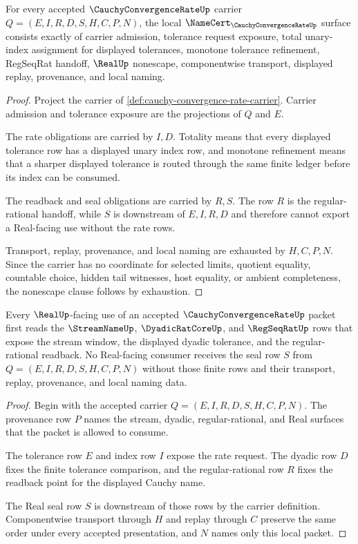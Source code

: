 \begin{theorem}
\label{thm:cauchy-convergence-rate-namecert-obligations}
For every accepted $\CauchyConvergenceRateUp$ carrier $Q=(E,I,R,D,S,H,C,P,N)$, the local $\NameCert_{\CauchyConvergenceRateUp}$ surface consists exactly of carrier admission, tolerance request exposure, total unary-index assignment for displayed tolerances, monotone tolerance refinement, RegSeqRat handoff, $\RealUp$ nonescape, componentwise transport, displayed replay, provenance, and local naming.
\end{theorem}
\begin{proof}
Project the carrier of \autoref{def:cauchy-convergence-rate-carrier}. Carrier admission and tolerance exposure are the projections of $Q$ and $E$.

The rate obligations are carried by $I,D$. Totality means that every displayed tolerance row has a displayed unary index row, and monotone refinement means that a sharper displayed tolerance is routed through the same finite ledger before its index can be consumed.

The readback and seal obligations are carried by $R,S$. The row $R$ is the regular-rational handoff, while $S$ is downstream of $E,I,R,D$ and therefore cannot export a Real-facing use without the rate rows.

Transport, replay, provenance, and local naming are exhausted by $H,C,P,N$. Since the carrier has no coordinate for selected limits, quotient equality, countable choice, hidden tail witnesses, host equality, or ambient completeness, the nonescape clause follows by exhaustion.
\end{proof}

\begin{theorem}
\label{thm:cauchy-convergence-rate-regseqrat-handoff}
Every $\RealUp$-facing use of an accepted $\CauchyConvergenceRateUp$ packet first reads the $\StreamNameUp$, $\DyadicRatCoreUp$, and $\RegSeqRatUp$ rows that expose the stream window, the displayed dyadic tolerance, and the regular-rational readback. No Real-facing consumer receives the seal row $S$ from $Q=(E,I,R,D,S,H,C,P,N)$ without those finite rows and their transport, replay, provenance, and local naming data.
\end{theorem}
\begin{proof}
Begin with the accepted carrier $Q=(E,I,R,D,S,H,C,P,N)$. The provenance row $P$ names the stream, dyadic, regular-rational, and Real surfaces that the packet is allowed to consume.

The tolerance row $E$ and index row $I$ expose the rate request. The dyadic row $D$ fixes the finite tolerance comparison, and the regular-rational row $R$ fixes the readback point for the displayed Cauchy name.

The Real seal row $S$ is downstream of those rows by the carrier definition. Componentwise transport through $H$ and replay through $C$ preserve the same order under every accepted presentation, and $N$ names only this local packet.
\end{proof}

